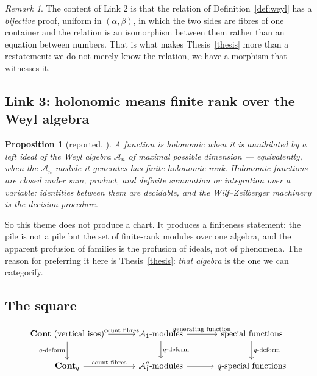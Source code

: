 \documentclass[11pt,a4paper]{article}
\newtheorem{proposition}[theorem]{Proposition}
\theoremstyle{definition}
\theoremstyle{remark}
\newtheorem{remark}[theorem]{Remark}
\newcommand{\cat}[1]{\mathbf{#1}}
\newcommand{\Cont}{\cat{Cont}}
\newcommand{\Weyl}{\mathcal{A}_1}
\newcommand{\Weylq}{\mathcal{A}_1^{q}}
\begin{document}
\begin{remark}\label{rem:bijective}
The content of Link 2 is that the relation of Definition~\ref{def:weyl} has a
\emph{bijective} proof, uniform in $(\alpha,\beta)$, in which the two sides are fibres
of one container and the relation is an isomorphism between them rather than an
equation between numbers. That is what makes Thesis~\ref{thesis} more than a
restatement: we do not merely know the relation, we have a morphism that witnesses it.
\end{remark}

\subsection{Link 3: holonomic means finite rank over the Weyl algebra}

\begin{proposition}[reported, \cite{Zeil90}]\label{prop:holonomic}
A function is \emph{holonomic} when it is annihilated by a left ideal of the Weyl
algebra $\mathcal{A}_n$ of maximal possible dimension --- equivalently, when the
$\mathcal{A}_n$-module it generates has finite holonomic rank. Holonomic functions are
closed under sum, product, and definite summation or integration over a variable;
identities between them are decidable, and the Wilf--Zeilberger machinery is the
decision procedure.
\end{proposition}

So this theme does not produce a chart. It produces a finiteness statement: the pile is
not a pile but the set of finite-rank modules over one algebra, and the apparent
profusion of families is the profusion of ideals, not of phenomena. The reason for
preferring it here is Thesis~\ref{thesis}: \emph{that algebra} is the one we can
categorify.

\subsection{The square}

\[
\begin{tikzcd}[row sep=2.0em, column sep=3.2em]
\Cont \text{ (vertical isos)} \arrow[r, "\text{count fibres}"] \arrow[d, "q\text{-deform}"']
  & \Weyl\text{-modules} \arrow[r, "\text{generating function}"] \arrow[d, "q\text{-deform}"]
  & \text{special functions} \arrow[d, "q\text{-deform}"] \\
\Cont_q \arrow[r, "\text{count fibres}"]
  & \Weylq\text{-modules} \arrow[r]
  & q\text{-special functions}
\end{tikzcd}
\]
\end{document}
